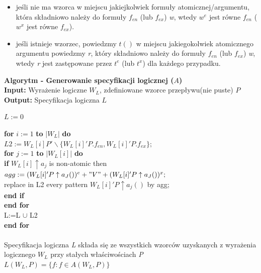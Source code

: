 \documentclass[a4paper, 11pt]{article}
\newcommand\tab[1][1cm]{\hspace*{#1}}
\begin{document}
	\begin{itemize}
		\item jeśli nie ma wzorca w miejscu jakiejkolwiek formuły atomicznej/argumentu, która składniowo należy do formuły $f_{en}$ (lub $f_{ex}$) \textit{w}, wtedy $w^e$ jest równe $f_{en}$ ($w^x$ jest równe $f_{ex}$).
		\item jeśli istnieje wzorzec, powiedzmy $t()$ w miejscu jakiegokolwiek atomicznego argumentu powiedzmy \textit{r}, który składniowo należy do formuły $f_{en}$ (lub $f_{ex}$) \textit{w}, wtedy \textit{r} jest zastępowane przez $t^e$ (lub $t^x$) dla każdego przypadku.
	\end{itemize}
	\textbf{Algorytm - Generowanie specyfikacji logicznej ($A$)}\\
	\textbf{Input:} Wyrażenie logiczne $W_L$, zdefiniowane wzorce przepływu(nie puste) $P$\\
	\textbf{Output:} Specyfikacja logiczna $L$
	
	$L:=0$
	
	\textbf{for} $i:=1$ \textbf{to} $|W_L|$ \textbf{do}\\
	\tab $L2:=W_L[i]P'\backslash \{W_L[i]'P.f_{en},W_L[i]'P.f_{ex}\};$\\	
	\tab \textbf{for} $j:=1$ \textbf{to} $|W_L[i]|$ \textbf{do}\\
	\tab \tab \textbf{if} $W_L[i] \uparrow a_j$ is non-atomic then \\
	\tab \tab \tab	$agg:=(W_L[i]'P\uparrow a_J())^e+"V"+(W_L[i]'P\uparrow a_J())^x;$\\
	\tab \tab \tab	replace in L2 every pattern $W_L[i]'P\uparrow a_j()$ by agg;\\
	\tab \tab	\textbf{end if}\\
	\tab  \textbf{end for}\\
	\tab  L:=L $\cup$ L2 \\
	\tab[0.5cm]\textbf{end for}
	\\
	\\
	Specyfikacja logiczna \textit{L} składa się ze wszystkich wzorców uzyskanych z wyrażenia logicznego $W_L$ przy stałych właściwościach \textit{P} 
	\\
	$L(W_L,P)=\{f:f\in A(W_L,P)\}$
	
\end{document}
